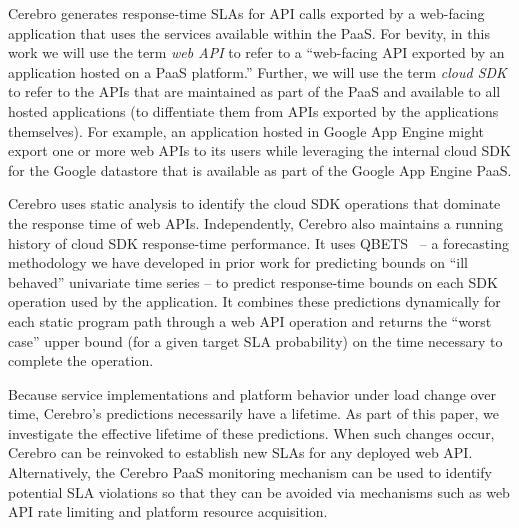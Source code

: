 Cerebro generates response-time SLAs for API calls exported by a web-facing
application
that uses the services available within the PaaS.  For bevity, in this work
we will use the
term \textit{web API} to refer to a ``web-facing API exported by an
application hosted on a PaaS platform.'' Further, 
we will use the term \textit{cloud
SDK} to refer to the APIs that are maintained as part of the PaaS and
available to all hosted applications
(to diffentiate them from APIs exported by the applications themselves).   
For example, an application hosted in Google App Engine might export one or
more web APIs to its users while leveraging the internal cloud SDK for the
Google datastore that is available as part of the Google App Engine PaaS.

Cerebro uses static analysis to identify the cloud SDK operations
that dominate the response time of web APIs.  Independently,
Cerebro also maintains a running history of cloud SDK response-time 
performance.  It uses
QBETS~\cite{Nurmi:2007:QQB:1791551.1791556} -- a forecasting methodology
we have developed in prior work for predicting bounds on ``ill behaved''   
univariate time series -- to predict response-time bounds on each SDK
operation used by the application.  It combines these predictions dynamically
for each static program path through a web API operation
and returns the ``worst case''
upper bound (for a given target SLA probability) on the time necessary to 
complete the operation.


Because service implementations and platform behavior under load change over time,
Cerebro's predictions necessarily have a lifetime.  
As part of this paper, we investigate
the effective lifetime of these predictions.  When such changes occur,
Cerebro can be reinvoked to establish new SLAs for any deployed web API.  Alternatively,
the Cerebro PaaS monitoring mechanism can be used to identify potential SLA violations
so that they can be avoided via mechanisms such 
as web API rate limiting and platform resource acquisition.

